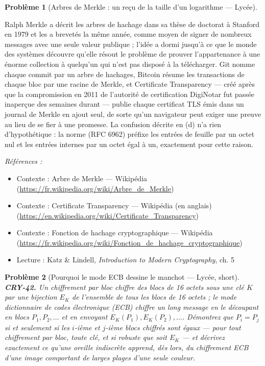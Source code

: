 \documentclass[11pt]{article}
\newtheorem{problem}{Problème}
\newenvironment{refs}{\par\small\noindent\emph{Références :}\begin{itemize}\setlength\itemsep{0pt}}{\end{itemize}\normalsize}
\begin{document}
\begin{problem}[{Arbres de Merkle : un reçu de la taille d'un logarithme --- Lycée}]
\end{problem}

\noindent Ralph Merkle a décrit les arbres de hachage dans sa thèse de doctorat à
Stanford en 1979 et les a brevetés la même année, comme moyen de signer de nombreux messages
avec une seule valeur publique ; l'idée a dormi jusqu'à ce que le monde des systèmes découvre
qu'elle résout le problème de prouver l'appartenance à une énorme collection à quelqu'un qui
n'est pas disposé à la télécharger. Git nomme chaque commit par un arbre de hachages, Bitcoin
résume les transactions de chaque bloc par une racine de Merkle, et Certificate Transparency ---
créé après que la compromission en 2011 de l'autorité de certification DigiNotar fut passée
inaperçue des semaines durant --- publie chaque certificat TLS émis dans un journal de Merkle en
ajout seul, de sorte qu'un navigateur peut exiger une preuve au lieu de se fier à une
promesse. La confusion décrite en (d) n'a rien d'hypothétique : la norme (RFC 6962) préfixe
les entrées de feuille par un octet nul et les entrées internes par un octet égal à un,
exactement pour cette raison.

\begin{refs}
\item Contexte : Arbre de Merkle --- Wikipédia (\url{https://fr.wikipedia.org/wiki/Arbre_de_Merkle})
\item Contexte : Certificate Transparency --- Wikipédia (en anglais) (\url{https://en.wikipedia.org/wiki/Certificate_Transparency})
\item Contexte : Fonction de hachage cryptographique --- Wikipédia (\url{https://fr.wikipedia.org/wiki/Fonction_de_hachage_cryptographique})
\item Lecture : Katz \& Lindell, \textit{Introduction to Modern Cryptography}, ch. 5
\end{refs}

\bigskip

\begin{problem}[{Pourquoi le mode ECB dessine le manchot --- Lycée, short}]
\textbf{CRY-42.} Un chiffrement par bloc chiffre des blocs de 16 octets
sous une clé $K$ par une bijection $E_K$ de l'ensemble de tous les blocs de 16 octets ; le
mode \textit{dictionnaire de codes électronique} (ECB) chiffre un long message en le découpant
en blocs $P_1, P_2, \dots$ et en envoyant $E_K(P_1), E_K(P_2), \dots$. Démontrez que
$P_i = P_j$ si et seulement si les $i$-ième et $j$-ième blocs chiffrés sont égaux --- pour
tout chiffrement par bloc, toute clé, et si robuste que soit $E_K$ --- et décrivez exactement
ce qu'une oreille indiscrète apprend, dès lors, du chiffrement ECB d'une image comportant de
larges plages d'une seule couleur.
\end{problem}
\end{document}

